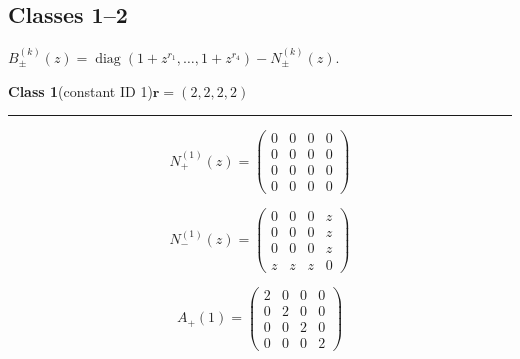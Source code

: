 \subsection*{Classes 1--2}
\noindent $B_\pm^{(k)}(z)=\operatorname{diag}(1+z^{r_1},\ldots,1+z^{r_4})-N_\pm^{(k)}(z)$.\par\medskip
\noindent\begin{minipage}{\linewidth}
\noindent\textbf{Class 1}\quad\small (constant ID 1)\hfill $\symbf{r}=(2,2,2,2)$
\par\smallskip\noindent\textcolor{rulegray}{\rule{\linewidth}{0.3pt}}
\begin{minipage}[c]{0.495\linewidth}\centering\fontsize{9.7}{12}\selectfont
\setlength{\abovedisplayskip}{4pt}\setlength{\belowdisplayskip}{4pt}
\setlength{\abovedisplayshortskip}{4pt}\setlength{\belowdisplayshortskip}{4pt}
\setlength{\arraycolsep}{3pt}\renewcommand{\arraystretch}{1.08}
\[N_{+}^{(1)}(z)=\begin{pmatrix}0 & 0 & 0 & 0\\0 & 0 & 0 & 0\\0 & 0 & 0 & 0\\0 & 0 & 0 & 0\end{pmatrix}\]
\end{minipage}%
\begin{minipage}[c]{0.495\linewidth}\centering\fontsize{9.7}{12}\selectfont
\setlength{\abovedisplayskip}{4pt}\setlength{\belowdisplayskip}{4pt}
\setlength{\abovedisplayshortskip}{4pt}\setlength{\belowdisplayshortskip}{4pt}
\setlength{\arraycolsep}{3pt}\renewcommand{\arraystretch}{1.08}
\[N_{-}^{(1)}(z)=\begin{pmatrix}0 & 0 & 0 & z\\0 & 0 & 0 & z\\0 & 0 & 0 & z\\z & z & z & 0\end{pmatrix}\]
\end{minipage}%
\par\noindent
\begin{minipage}[c]{0.495\linewidth}\centering\fontsize{9.7}{12}\selectfont
\setlength{\abovedisplayskip}{4pt}\setlength{\belowdisplayskip}{4pt}
\setlength{\abovedisplayshortskip}{4pt}\setlength{\belowdisplayshortskip}{4pt}
\setlength{\arraycolsep}{3pt}\renewcommand{\arraystretch}{1.08}
\[A_{+}(1)=\begin{pmatrix}2 & 0 & 0 & 0\\0 & 2 & 0 & 0\\0 & 0 & 2 & 0\\0 & 0 & 0 & 2\end{pmatrix}\]

\end{minipage}
\end{minipage}
